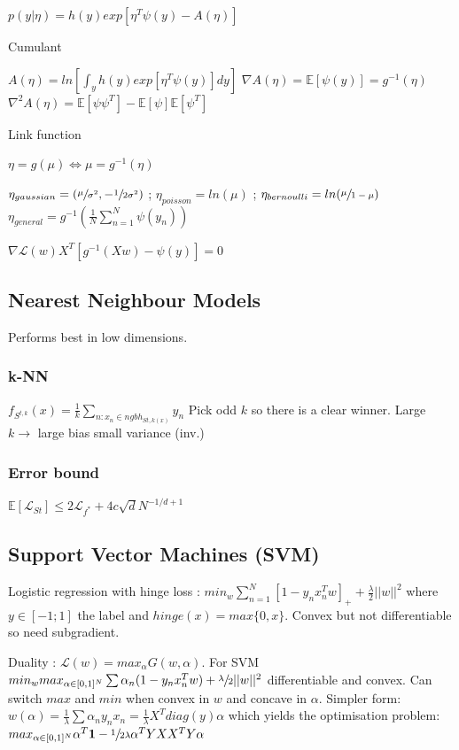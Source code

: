 $p(y|\eta) = h(y) exp[\eta^T \psi(y) - A(\eta)]$

Cumulant

$A(\eta) = ln[\int_y h(y) exp[\eta^T \psi(y)] dy]$
\newline
$\nabla A(\eta) = \mathbb{E}[\psi(y)] = g^{-1}(\eta)$
\newline
$\nabla^2 A(\eta) = \mathbb{E}[\psi\psi^T] - \mathbb{E}[\psi]\mathbb{E}[\psi^T]$

Link function

$\eta = g(\mu) \Leftrightarrow \mu = g^{-1}(\eta)$

$\eta_{gaussian} = (\sfrac{\mu}{\sigma^2}, -\sfrac{1}{2 \sigma^2})$
; $\eta_{poisson} = ln(\mu)$
; $\eta_{bernoulli} = ln(\sfrac{\mu}{1 - \mu})$
\newline $\eta_{general} = g^{-1}(\frac{1}{N} \sum_{n=1}^N \psi(y_n))$

$\nabla \mathcal{L}(w) X^T [g^{-1}(Xw)- \psi(y)]= 0$

\subsection{Nearest Neighbour Models}
Performs best in low dimensions.
\subsubsection{k-NN}
$f_{S^{t,k}}(x) = \frac{1}{k} \sum_{n:x_n\in ngbh_{S{t,k}(x)}} y_n$
Pick odd $k$ so there is a clear winner.
Large $k \rightarrow$ large bias small variance (inv.)

\subsubsection{Error bound}
$\mathbb{E}[\mathcal{L}_{St}] \le 2 \mathcal{L}_{f^*} + 4 c \sqrt{d} N^{-1/d+1}$

\subsection{Support Vector Machines (SVM)}
Logistic regression with hinge loss :
$min_w \sum_{n=1}^N [1-y_n x_n^T w]_+ + \frac{\lambda}{2} ||w||^2$ where $y \in [-1;1]$ the label and $hinge(x)= max\{0,x\}$. Convex but not differentiable so need subgradient.

Duality : $\mathcal{L}(w) = max_{\alpha} G(w, \alpha)$. For SVM
$min_{w} max_{\alpha \in [0,1]^N} \sum \alpha_n (1 - y_nx_n^Tw) + \sfrac{\lambda}{2} ||w||^2$ differentiable and convex. Can switch $max$ and $min$ when convex in $w$ and concave in $\alpha$. Simpler form:\newline
$w(\alpha) = \frac{1}{\lambda} \sum \alpha_n y_n x_n = \frac{1}{\lambda} X^T diag(y) \alpha$ which yields the optimisation problem:\newline
$max_{\alpha \in [0,1]^N} \alpha^T\mathbf{1} - \sfrac{1}{2\lambda} \alpha^T Y X X^T Y \alpha$\newline


